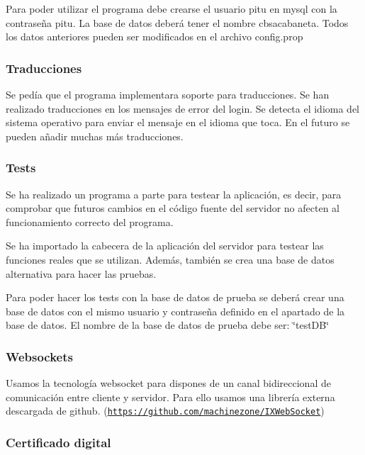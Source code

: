 Para poder utilizar el programa debe crearse el usuario \textquotesingle{}pitu\textquotesingle{} en mysql con la contraseña \textquotesingle{}pitu\textquotesingle{}. La base de datos deberá tener el nombre cbsacabaneta. Todos los datos anteriores pueden ser modificados en el archivo config.\+prop

\subsubsection*{Traducciones}

Se pedía que el programa implementara soporte para traducciones. Se han realizado traducciones en los mensajes de error del login. Se detecta el idioma del sistema operativo para enviar el mensaje en el idioma que toca. En el futuro se pueden añadir muchas más traducciones.

\subsubsection*{Tests}

Se ha realizado un programa a parte para testear la aplicación, es decir, para comprobar que futuros cambios en el código fuente del servidor no afecten al funcionamiento correcto del programa.

Se ha importado la cabecera de la aplicación del servidor para testear las funciones reales que se utilizan. Además, también se crea una base de datos alternativa para hacer las pruebas.

Para poder hacer los tests con la base de datos de prueba se deberá crear una base de datos con el mismo usuario y contraseña definido en el apartado de la base de datos. El nombre de la base de datos de prueba debe ser\+: \char`\"{}test\+D\+B\char`\"{}

\subsubsection*{Websockets}

Usamos la tecnología websocket para dispones de un canal bidireccional de comunicación entre cliente y servidor. Para ello usamos una librería externa descargada de github. (\href{https://github.com/machinezone/IXWebSocket}{\tt https\+://github.\+com/machinezone/\+I\+X\+Web\+Socket})

\subsubsection*{Certificado digital}

